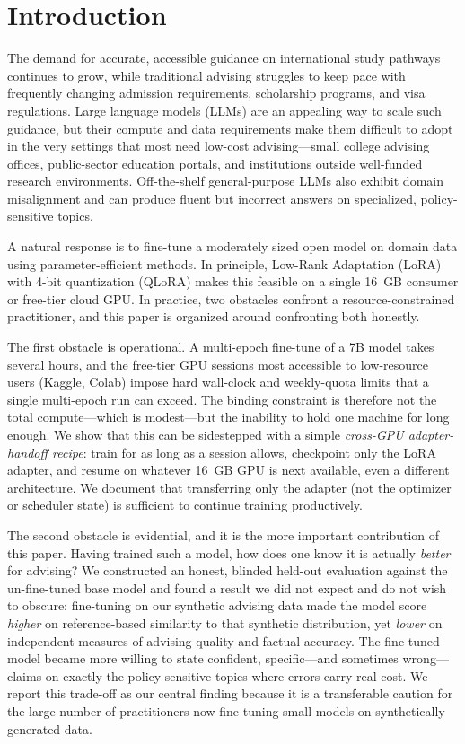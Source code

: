 \documentclass[11pt, a4paper]{article}
\begin{document}
\section{Introduction}
The demand for accurate, accessible guidance on international study pathways continues to grow, while traditional advising struggles to keep pace with frequently changing admission requirements, scholarship programs, and visa regulations. Large language models (LLMs) are an appealing way to scale such guidance, but their compute and data requirements make them difficult to adopt in the very settings that most need low-cost advising---small college advising offices, public-sector education portals, and institutions outside well-funded research environments. Off-the-shelf general-purpose LLMs also exhibit domain misalignment and can produce fluent but incorrect answers on specialized, policy-sensitive topics.

A natural response is to fine-tune a moderately sized open model on domain data using parameter-efficient methods. In principle, Low-Rank Adaptation (LoRA) with 4-bit quantization (QLoRA) makes this feasible on a single 16~GB consumer or free-tier cloud GPU. In practice, two obstacles confront a resource-constrained practitioner, and this paper is organized around confronting both honestly.

The first obstacle is operational. A multi-epoch fine-tune of a 7B model takes several hours, and the free-tier GPU sessions most accessible to low-resource users (Kaggle, Colab) impose hard wall-clock and weekly-quota limits that a single multi-epoch run can exceed. The binding constraint is therefore not the total compute---which is modest---but the inability to hold one machine for long enough. We show that this can be sidestepped with a simple \emph{cross-GPU adapter-handoff recipe}: train for as long as a session allows, checkpoint only the LoRA adapter, and resume on whatever 16~GB GPU is next available, even a different architecture. We document that transferring only the adapter (not the optimizer or scheduler state) is sufficient to continue training productively.

The second obstacle is evidential, and it is the more important contribution of this paper. Having trained such a model, how does one know it is actually \emph{better} for advising? We constructed an honest, blinded held-out evaluation against the un-fine-tuned base model and found a result we did not expect and do not wish to obscure: fine-tuning on our synthetic advising data made the model score \emph{higher} on reference-based similarity to that synthetic distribution, yet \emph{lower} on independent measures of advising quality and factual accuracy. The fine-tuned model became more willing to state confident, specific---and sometimes wrong---claims on exactly the policy-sensitive topics where errors carry real cost. We report this trade-off as our central finding because it is a transferable caution for the large number of practitioners now fine-tuning small models on synthetically generated data.
\end{document}
